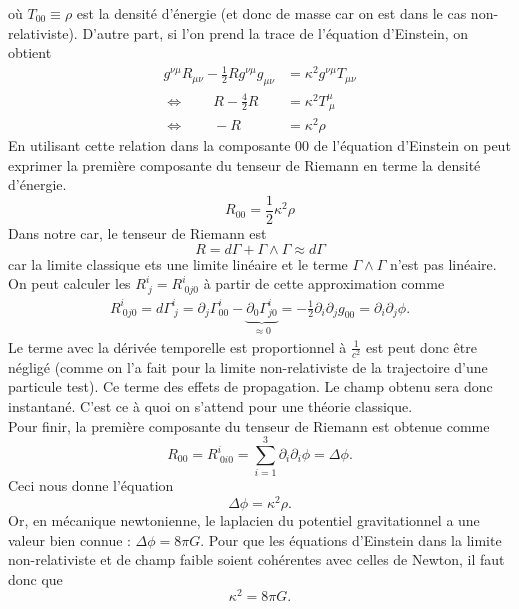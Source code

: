 \documentclass[a4paper,11pt]{report}
\theoremstyle{definition}
\theoremstyle{plain}
\theoremstyle{definition}
\theoremstyle{remark}
\newcommand{\p}{\partial}
\begin{document}
            où $T_{00}\equiv\rho$ est la densité d'énergie (et donc de masse car on est dans le cas non-relativiste). D'autre part, si l'on prend la trace de l'équation d'Einstein, on obtient
            \begin{align}
                g^{\nu\mu}R_{\mu\nu} - \frac{1}{2}Rg^{\nu\mu}g_{\mu\nu} &= \kappa^2g^{\nu\mu}T_{\mu\nu}\\
                \Leftrightarrow \qquad R-\frac{4}{2}R &= \kappa^2 T^\mu_{~\mu}\\
                \Leftrightarrow\qquad -R &= \kappa^2 \rho
            \end{align}
            En utilisant cette relation dans la composante $00$ de l'équation d'Einstein on peut exprimer la première composante du tenseur de Riemann en terme la densité d'énergie.
            \begin{equation}
                R_{00} = \frac{1}{2}\kappa^2\rho
            \end{equation}
            Dans notre car, le tenseur de Riemann est 
            \begin{equation}
                R = d\Gamma + \Gamma\wedge\Gamma \approx d\Gamma
            \end{equation}
            car la limite classique ets une limite linéaire et le terme $\Gamma\wedge\Gamma$ n'est pas linéaire. On peut calculer les $R^i_{~j} = R^i_{~0j0}$ à partir de cette approximation comme
            \begin{align}
                R^i_{~0j0} =d\Gamma^i_{~j} = \p_j\Gamma^i_{00}-\underbrace{\p_0\Gamma^i_{j0}}_{\approx 0} = -\frac{1}{2}\p_i\p_j g_{00} = \p_i\p_j \phi.
            \end{align}
            Le terme avec la dérivée temporelle est proportionnel à $\frac{1}{c^2}$ est peut donc être négligé (comme on l'a fait pour la limite non-relativiste de la trajectoire d'une particule test). Ce terme des effets de propagation. Le champ obtenu sera donc instantané. C'est ce à quoi on s'attend pour une théorie classique.\\
            
            Pour finir, la première composante du tenseur de Riemann est obtenue comme
            \begin{equation}
                R_{00} = R^i_{~0i0} = \sum_{i=1}^3 \p_i\p_i \phi = \Delta\phi.
            \end{equation}
            Ceci nous donne l'équation
            \begin{equation}
                \Delta\phi = \kappa^2\rho.
            \end{equation}
            Or, en mécanique newtonienne, le laplacien du potentiel gravitationnel a une valeur bien connue : $\Delta\phi = 8\pi G$. Pour que les équations d'Einstein dans la limite non-relativiste et de champ faible soient cohérentes avec celles de Newton, il faut donc que
            \begin{equation}
                \kappa^2 = 8\pi G.
            \end{equation}
            
\end{document}
